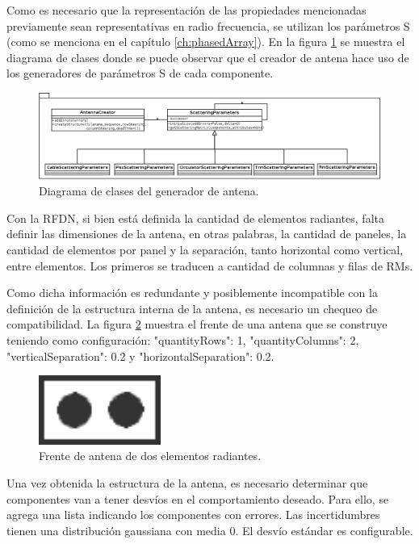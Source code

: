 Como es necesario que la representación de las propiedades mencionadas previamente sean representativas en radio frecuencia,
se utilizan los parámetros S (como se menciona en el capítulo \ref{ch:phasedArray}). En la figura \ref{fig:creationPackage} 
se muestra el diagrama de clases donde se puede observar que el creador de antena hace uso de los generadores de parámetros S 
de cada componente.

\begin{figure}
 \centering
 \includegraphics[width=15cm]{gfx/creationPackage.png}
 \caption{Diagrama de clases del generador de antena.}
 \label{fig:creationPackage}
\end{figure}

Con la RFDN, si bien está definida la cantidad de elementos radiantes, falta definir las dimensiones de la antena, 
en otras palabras, la cantidad de paneles, la cantidad de elementos por panel y la separación, tanto horizontal como vertical,
entre elementos. Los primeros se traducen a cantidad de columnas y filas de RMs. 

Como dicha información es redundante y posiblemente incompatible con la definición de la estructura interna de la antena, es 
necesario un chequeo de compatibilidad. La figura \ref{fig:frontAntenna} muestra el frente de una antena que se construye 
teniendo como configuración: "quantityRows": 1, "quantityColumns": 2, "verticalSeparation": 0.2 y "horizontalSeparation": 0.2.

\begin{figure}
 \centering
 \includegraphics[width=4cm]{gfx/FrontAntenna2.png}
 \caption{Frente de antena de dos elementos radiantes.}
 \label{fig:frontAntenna}
\end{figure}

Una vez obtenida la estructura de la antena, es necesario determinar que componentes van a tener desvíos en el comportamiento 
deseado. Para ello, se agrega una lista indicando los componentes con errores. Las incertidumbres tienen una distribución 
gaussiana con media 0. El desvío estándar es configurable.

